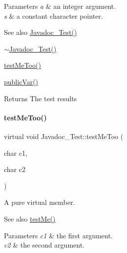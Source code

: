 \begin{DoxyParams}{Parameters}
{\em a} & an integer argument. \\
\hline
{\em s} & a constant character pointer. \\
\hline
\end{DoxyParams}
\begin{DoxySeeAlso}{See also}
\mbox{\hyperlink{class_javadoc___test_a17313327932ae97596b0a455ba8342cc}{Javadoc\+\_\+\+Test()}} 

\mbox{\hyperlink{class_javadoc___test_a60016cd15a4ed82bbc35be79a0a6a6b5}{$\sim$\+Javadoc\+\_\+\+Test()}} 

\mbox{\hyperlink{class_javadoc___test_ac2b39cabbe80957ae3e8bc2bd4e887f6}{test\+Me\+Too()}} 

\mbox{\hyperlink{class_javadoc___test_a44a516fbc3a4865e2dcae34649c9df6a}{public\+Var()}} 
\end{DoxySeeAlso}
\begin{DoxyReturn}{Returns}
The test results 
\end{DoxyReturn}
\mbox{\label{class_javadoc___test_ac2b39cabbe80957ae3e8bc2bd4e887f6}} 
\paragraph{\texorpdfstring{testMeToo()}{testMeToo()}}
{\footnotesize\ttfamily virtual void Javadoc\+\_\+\+Test\+::test\+Me\+Too (\begin{DoxyParamCaption}\item[{char}]{c1,  }\item[{char}]{c2 }\end{DoxyParamCaption})\hspace{0.3cm}{\ttfamily [pure virtual]}}



A pure virtual member. 

\begin{DoxySeeAlso}{See also}
\mbox{\hyperlink{class_javadoc___test_a0c472683ed25ff096e8a9edfb18d550c}{test\+Me()}} 
\end{DoxySeeAlso}

\begin{DoxyParams}{Parameters}
{\em c1} & the first argument. \\
\hline
{\em c2} & the second argument. \\
\hline
\end{DoxyParams}


